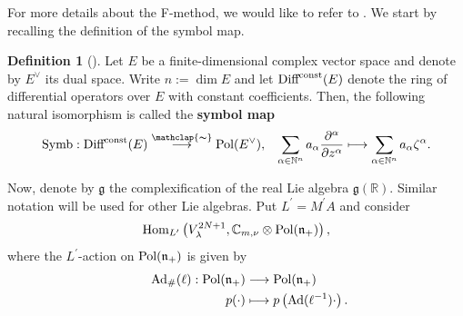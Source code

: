 \documentclass[12pt, pdflatex, a4paper]{article}
\theoremstyle{plain}
\theoremstyle{definition}
\newtheorem{defn}[thm]{Definition}
\def\Ad{\text{\normalfont{Ad}}}
\def\C{{\mathbb C}}
\def\Diff{\text{\normalfont{Diff}}}
\def\g{\mathfrak{g}}
\def\Hom{\text{\normalfont{Hom}}}
\def\N{{\mathbb N}}
\def\n{\mathfrak{n}}
\def\Pol{\text{\normalfont{Pol}}}
\def\R{{\mathbb R}}
\def\Symb{\text{\normalfont{Symb}}}
\newcommand\arrowsimeq{\stackrel{\mathclap{\thicksim}}{\longrightarrow}}
\begin{document}
For more details about the F-method, we would like to refer to \cite{Kob13, Kob14, KP16a, KP16b, KO25, Per-Val23}. We start by recalling the definition of the symbol map.

\begin{defn}[{\cite[Sec. 4.1]{KP16a}}] Let $E$ be a finite-dimensional complex vector space and denote by $E^\vee$ its dual space. Write $n:= \dim E$ and let $\Diff^\text{const}(E)$ denote the ring of differential operators over $E$ with constant coefficients. Then, the following natural isomorphism is called the \textbf{symbol map}
\begin{equation}\label{symbolmap}
\Symb: \Diff^\text{const}(E) \arrowsimeq \Pol(E^\vee),
\hspace{0.3cm} \sum_{\alpha \in \N^n} a_\alpha \frac{\partial^\alpha}{\partial z^\alpha} \longmapsto  \sum_{\alpha \in \N^n} a_\alpha \zeta^\alpha.
\end{equation}
\end{defn}

Now, denote by $\g$ the complexification of the real Lie algebra $\g(\R)$. Similar notation will be used for other Lie algebras. Put $L^\prime = M^\prime A$ and consider
\begin{equation*}
\Hom_{L^\prime}\left(V_\lambda^{2N+1}, \C_{m,\nu} \otimes \Pol(\n_+)\right),
\end{equation*}
where the $L^\prime$-action on $\Pol(\n_+)$ is given by
\begin{equation*}
\begin{aligned}
\Ad_\#(\ell): \Pol(\n_+) &\longrightarrow \Pol(\n_+)\\
\hspace{2.8cm} p(\cdot) &\longmapsto p\left(\Ad(\ell^{-1}) \cdot\right).
\end{aligned}
\end{equation*}
\end{document}
